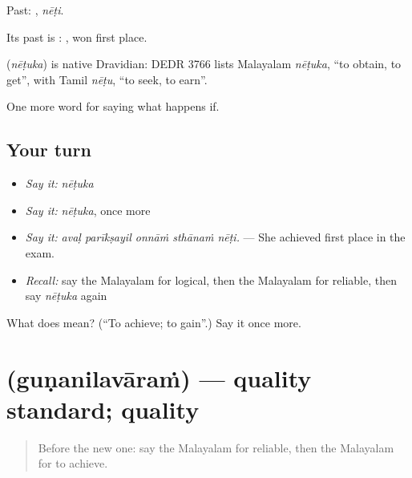 Past: , \emph{nēṭi}.

Its past is :   , won first place.

\begin{cousinweb}
\textbf{} (\emph{nēṭuka}) is native Dravidian: DEDR 3766 lists Malayalam \emph{nēṭuka}, \textquotedblleft{}to obtain, to get\textquotedblright{}, with Tamil \emph{nēṭu}, \textquotedblleft{}to seek, to earn\textquotedblright{}.
\end{cousinweb}

\begin{grammarlens}[title={What you've built}]
One more word for saying what happens if.
\end{grammarlens}

\subsection*{Your turn}
\begin{itemize}
\raggedright
  \item \emph{Say it:} \emph{nēṭuka}
  \item \emph{Say it:} \emph{nēṭuka}, once more
  \item \emph{Say it:} \emph{avaḷ parīkṣayil onnāṁ sthānaṁ nēṭi.} — She achieved first place in the exam.
  \item \emph{Recall:} say the Malayalam for logical, then the Malayalam for reliable, then say \emph{nēṭuka} again
\end{itemize}

\begin{tcolorbox}[breakable,colback=teal!4,colframe=teal!35!black,title={Before you move on}]
What does  mean? (\textquotedblleft{}To achieve; to gain\textquotedblright{}.) Say it once more.
\end{tcolorbox}
\section[\texorpdfstring{\ml{ഗുണനിലവാരം} (guṇanilavāraṁ)}{ഗുണനിലവാരം (guṇanilavāraṁ)}]{ (guṇanilavāraṁ) — quality standard; quality}

\label{lesson:ML-C447-gunanilavaram}



\begin{quote}
Before the new one: say the Malayalam for reliable, then the Malayalam for to achieve.
\end{quote}

